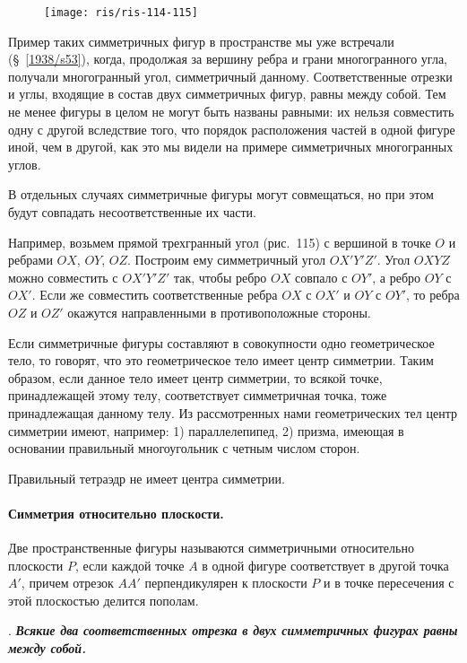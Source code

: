 \documentclass[twoside]{book}
\begin{document}
\begin{figure}[h!]
\centering
\texttt{[image: ris/ris-114-115]}
\caption{}
\end{figure}

Пример таких симметричных фигур в пространстве мы уже встречали (§~\ref{1938/s53}), когда, продолжая за вершину ребра и грани многогранного угла, получали многогранный угол, симметричный данному.
Соответственные отрезки и углы, входящие в состав двух симметричных фигур, равны между собой.
Тем не менее фигуры в целом не могут быть названы равными: их нельзя совместить одну с другой вследствие того, что порядок расположения частей в одной фигуре иной, чем в другой, как это мы видели на примере симметричных многогранных углов.

В отдельных случаях симметричные фигуры могут совмещаться, но при этом будут совпадать несоответственные их части.

Например, возьмем прямой трехгранный угол (рис.~115) с вершиной в точке $O$ и ребрами $OX$, $OY$, $OZ$.
Построим ему симметричный угол $OX'Y'Z'$.
Угол $OXYZ$ можно совместить с $OX'Y'Z'$ так, чтобы ребро $OX$ совпало с $OY'$, а ребро $OY$ с $OX'$.
Если же совместить соответственные ребра $OX$ с $OX'$ и $OY$ с $OY'$, то ребра $OZ$ и $OZ'$ окажутся направленными в противоположные стороны.

Если симметричные фигуры составляют в совокупности одно геометрическое тело, то говорят, что это геометрическое тело имеет центр симметрии.
Таким образом, если данное тело имеет центр симметрии, то всякой точке, принадлежащей этому телу, соответствует симметричная точка, тоже принадлежащая данному телу.
Из рассмотренных нами геометрических тел центр симметрии имеют, например: 1) параллелепипед, 2) призма, имеющая в основании правильный многоугольник с четным числом сторон.

Правильный тетраэдр не имеет центра симметрии.

\paragraph{Симметрия относительно плоскости.}\label{1938/s100}
Две пространственные фигуры называются симметричными относительно плоскости $P$, если каждой точке $A$ в одной фигуре соответствует в другой точка $A'$, причем отрезок $AA'$ перпендикулярен к плоскости $P$ и в точке пересечения с этой плоскостью делится пополам.

.
\textbf{\emph{Всякие два соответственных отрезка в двух симметричных фигурах равны между собой.}}
\end{document}
